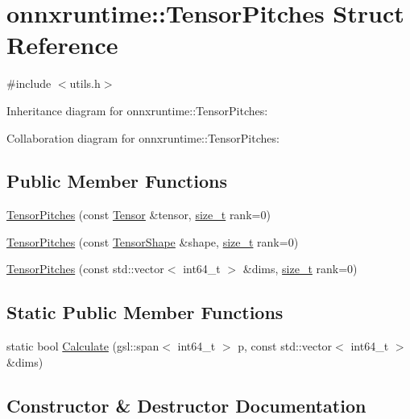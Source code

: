 \hypertarget{structonnxruntime_1_1TensorPitches}{}\section{onnxruntime\+:\+:Tensor\+Pitches Struct Reference}
\label{structonnxruntime_1_1TensorPitches}


{\ttfamily \#include $<$utils.\+h$>$}



Inheritance diagram for onnxruntime\+:\+:Tensor\+Pitches\+:


Collaboration diagram for onnxruntime\+:\+:Tensor\+Pitches\+:
\subsection*{Public Member Functions}
\begin{DoxyCompactItemize}
\item 
\mbox{\hyperlink{structonnxruntime_1_1TensorPitches_afc1f0b1aca8824ee490a523364b730dd}{Tensor\+Pitches}} (const \mbox{\hyperlink{classonnxruntime_1_1Tensor}{Tensor}} \&tensor, \mbox{\hyperlink{mlasi_8h_a503efbc1c6e50825320ad909366b78ab}{size\+\_\+t}} rank=0)
\item 
\mbox{\hyperlink{structonnxruntime_1_1TensorPitches_a3a3a2df2807bd9fb8528d554525ff8f6}{Tensor\+Pitches}} (const \mbox{\hyperlink{classonnxruntime_1_1TensorShape}{Tensor\+Shape}} \&shape, \mbox{\hyperlink{mlasi_8h_a503efbc1c6e50825320ad909366b78ab}{size\+\_\+t}} rank=0)
\item 
\mbox{\hyperlink{structonnxruntime_1_1TensorPitches_a378a2a4970cb24ed3bb0ff64d4e11c36}{Tensor\+Pitches}} (const std\+::vector$<$ int64\+\_\+t $>$ \&dims, \mbox{\hyperlink{mlasi_8h_a503efbc1c6e50825320ad909366b78ab}{size\+\_\+t}} rank=0)
\end{DoxyCompactItemize}
\subsection*{Static Public Member Functions}
\begin{DoxyCompactItemize}
\item 
static bool \mbox{\hyperlink{structonnxruntime_1_1TensorPitches_a406e89348dd83badf0483bfd9df832a7}{Calculate}} (gsl\+::span$<$ int64\+\_\+t $>$ p, const std\+::vector$<$ int64\+\_\+t $>$ \&dims)
\end{DoxyCompactItemize}


\subsection{Constructor \& Destructor Documentation}
\mbox{\label{structonnxruntime_1_1TensorPitches_afc1f0b1aca8824ee490a523364b730dd}} 
